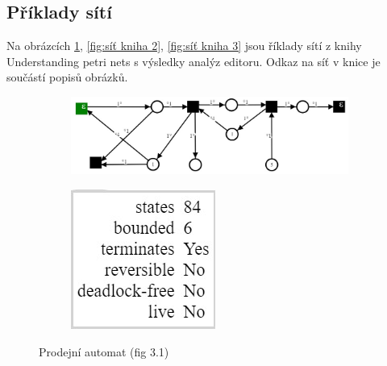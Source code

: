 \documentclass[
  biblatex,
  glossaries,
  index
]{kidiplom}
\begin{document}
\subsection{Příklady sítí}
Na obrázcích \ref{fig:síť kniha 1}, \ref{fig:síť kniha 2}, \ref{fig:síť kniha 3} jsou říklady sítí z knihy Understanding petri nets\cite{reisig2013understanding} 
s výsledky analýz editoru.
Odkaz na síť v knice je součástí popisů obrázků.

\begin{figure}[h]
  \centering
  \begin{subfigure}[h]{0.78\linewidth}
    \includegraphics[width=\linewidth]{net_cooking_vending_machine}
  \end{subfigure}
  \begin{subfigure}[h]{0.2\linewidth}
    \includegraphics[width=\linewidth]{net_cooking_vending_machine_analysis}
  \end{subfigure}
  \caption{Prodejní automat (fig 3.1)}
  \label{fig:síť kniha 1}
\end{figure}
\end{document}
